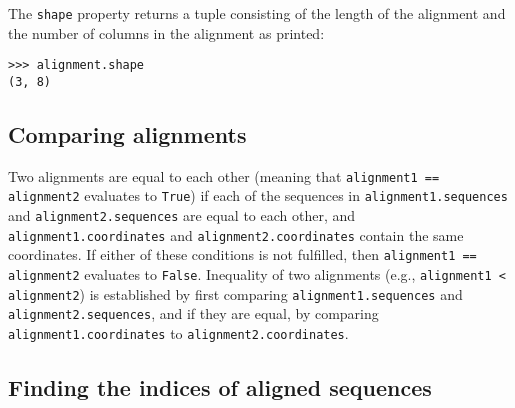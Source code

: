 The \verb+shape+ property returns a tuple consisting of the length of the
alignment and the number of columns in the alignment as printed:

\begin{verbatim}
>>> alignment.shape
(3, 8)
\end{verbatim}

\subsection{Comparing alignments}

Two alignments are equal to each other (meaning that \verb|alignment1 == alignment2| evaluates to \verb|True|) if each of the sequences in \verb|alignment1.sequences| and \verb|alignment2.sequences| are equal to each other, and \verb|alignment1.coordinates| and \verb|alignment2.coordinates| contain the same coordinates. If either of these conditions is not fulfilled, then \verb|alignment1 == alignment2| evaluates to \verb|False|. Inequality of two alignments (e.g., \verb|alignment1 < alignment2|) is established by first comparing \verb|alignment1.sequences| and \verb|alignment2.sequences|, and if they are equal, by comparing \verb|alignment1.coordinates| to \verb|alignment2.coordinates|.

\subsection{Finding the indices of aligned sequences}

